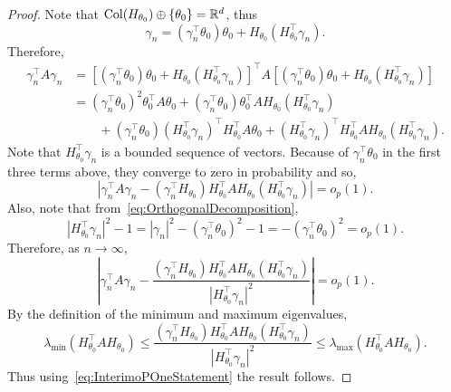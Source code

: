 \begin{proof}
Note that $\text{Col}(H_{\theta_0}) \oplus\{\theta_0\} =\mathbb{R}^d$, thus
\begin{equation}\label{eq:OrthogonalDecomposition}
\gamma_n = \left(\gamma_n^{\top}\theta_0\right)\theta_0 + H_{\theta_0}\left(H_{\theta_0}^{\top}\gamma_n\right).
\end{equation}
Therefore,
\begin{align*}
\gamma_n^{\top}A\gamma_n &= \left[\left(\gamma_n^{\top}\theta_0\right)\theta_0 + H_{\theta_0}\left(H_{\theta_0}^{\top}\gamma_n\right)\right]^{\top}A\left[\left(\gamma_n^{\top}\theta_0\right)\theta_0 + H_{\theta_0}\left(H_{\theta_0}^{\top}\gamma_n\right)\right]\\
&= \left(\gamma_n^{\top}\theta_0\right)^2\theta_0^{\top}A\theta_0 + \left(\gamma_n^{\top}\theta_0\right)\theta_0^{\top}AH_{\theta_0}\left(H_{\theta_0}^{\top}\gamma_n\right)\\ &\qquad+ \left(\gamma_n^{\top}\theta_0\right)\left(H_{\theta_0}^{\top}\gamma_n\right)^{\top}H_{\theta_0}^{\top}A\theta_0 + \left(H_{\theta_0}^{\top}\gamma_n\right)^{\top}H_{\theta_0}^{\top}AH_{\theta_0}\left(H_{\theta_0}^{\top}\gamma_n\right).
\end{align*}
Note that $H_{\theta_0}^{\top}\gamma_n$ is a bounded sequence of vectors. Because of $\gamma_n^{\top}\theta_0$ in the first three terms above, they converge to zero in probability and so,
\[
\left|\gamma_n^{\top}A\gamma_n - \left(\gamma_n^{\top}H_{\theta_0}\right)H_{\theta_0}^{\top}AH_{\theta_0}\left(H_{\theta_0}^{\top}\gamma_n\right)\right| = o_p(1).
\]
Also, note that from~\eqref{eq:OrthogonalDecomposition},
\[
|H_{\theta_0}^{\top}\gamma_n|^2 - 1 = |\gamma_n|^2 - \left(\gamma_n^{\top}\theta_0\right)^2 - 1 = - \left(\gamma_n^{\top}\theta_0\right)^2 = o_p(1).
\]
Therefore, as $n\to\infty$,
\begin{equation}\label{eq:InterimoPOneStatement}
\left|\gamma_n^{\top}A\gamma_n - \frac{\left(\gamma_n^{\top}H_{\theta_0}\right)H_{\theta_0}^{\top}AH_{\theta_0}\left(H_{\theta_0}^{\top}\gamma_n\right)}{|H_{\theta_0}^{\top}\gamma_n|^2}\right| = o_p(1).
\end{equation}
By the definition of the minimum and maximum eigenvalues,
\[
\lambda_{\min}\left(H_{\theta_0}^{\top}AH_{\theta_0}\right) \le \frac{\left(\gamma_n^{\top}H_{\theta_0}\right)H_{\theta_0}^{\top}AH_{\theta_0}\left(H_{\theta_0}^{\top}\gamma_n\right)}{|H_{\theta_0}^{\top}\gamma_n|^2} \le \lambda_{\max}\left(H_{\theta_0}^{\top}AH_{\theta_0}\right).
\]
Thus using~\eqref{eq:InterimoPOneStatement} the result follows.
\end{proof}
